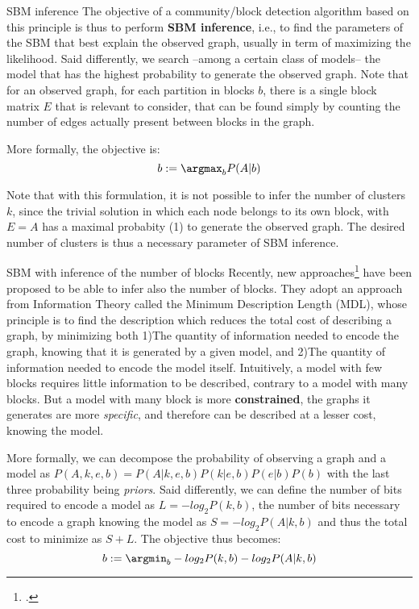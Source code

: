 \begin{textbox}{SBM inference}
The objective of a community/block detection algorithm based on this principle is thus to perform \textbf{SBM inference}, i.e., to find the parameters of the SBM that best explain the observed graph, usually in term of maximizing the likelihood. Said differently, we search --among a certain class of models-- the model that has the highest probability to generate the observed graph. Note that for an observed graph, for each partition in blocks $b$, there is a single block matrix $E$ that is relevant to consider, that can be found simply by counting the number of edges actually present between blocks in the graph.  

More formally, the objective is:
\[
b:=\argmax_{b} P(A|b)
\]

Note that with this formulation, it is not possible to infer the number of clusters $k$, since the trivial solution in which each node belongs to its own block, with $E=A$ has a maximal probabity (1) to generate the observed graph. The desired number of clusters is thus a necessary parameter of SBM inference.
\end{textbox}






\begin{textbox}{SBM with inference of the number of blocks}
Recently, new approaches\footcite{peixoto2019bayesian} have been proposed to be able to infer also the number of blocks. They adopt an approach from Information Theory called the Minimum Description Length (MDL), whose principle is to find the description which reduces the total cost of describing a graph, by minimizing both 1)The quantity of information needed to encode the graph, knowing that it is generated by a given model, and 2)The quantity of information needed to encode the model itself. Intuitively, a model with few blocks requires little information to be described, contrary to a model with many blocks. But a model with many block is more \textbf{constrained}, the graphs it generates are more \textit{specific}, and therefore can be described at a lesser cost, knowing the model.

More formally, we can decompose the probability of observing a graph and a model as $P (A, k, e, b) = P (A|k, e, b)P (k|e, b)P (e|b)P (b)$ with the last three probability being \textit{priors}.  Said differently, we can define the number of bits required to encode a model as $L = -log_2 P(k,b)$, the number of bits necessary to encode a graph knowing the model as $S = -log_2 P(A|k,b)$ and thus the total cost to minimize as $S+L$. The objective thus becomes:
\[
b:=\argmin_{b} - log_2 P(k,b) - log_2 P(A|k,b)
\]

\end{textbox}






